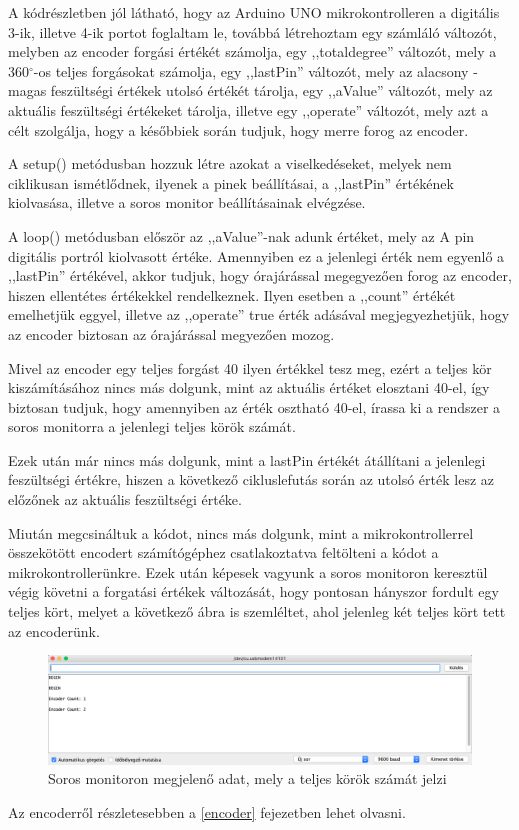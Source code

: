\documentclass[
]{thesis-ekf}
\theoremstyle{definition}
\theoremstyle{remark}
\begin{document}
			
			\par A kódrészletben jól látható, hogy az Arduino UNO mikrokontrolleren a digitális 3-ik, illetve 4-ik portot foglaltam le, továbbá létrehoztam egy számláló változót, melyben az encoder forgási értékét számolja, egy ,,totaldegree'' változót, mely a 360$^{\circ}$-os teljes forgásokat számolja, egy ,,lastPin'' változót, mely az alacsony - magas feszültségi értékek utolsó értékét tárolja, egy ,,aValue'' változót, mely az aktuális feszültségi értékeket tárolja, illetve egy ,,operate'' változót, mely azt a célt szolgálja, hogy a későbbiek során tudjuk, hogy merre forog az encoder.
			\par A setup() metódusban hozzuk létre azokat a viselkedéseket, melyek nem ciklikusan ismétlődnek, ilyenek a pinek beállításai, a ,,lastPin'' értékének kiolvasása, illetve a soros monitor beállításainak elvégzése.
			\par A loop() metódusban először az ,,aValue''-nak adunk értéket, mely az A pin digitális portról kiolvasott értéke. Amennyiben ez a jelenlegi érték nem egyenlő a ,,lastPin'' értékével, akkor tudjuk, hogy órajárással megegyezően forog az encoder, hiszen ellentétes értékekkel rendelkeznek. Ilyen esetben a ,,count'' értékét emelhetjük eggyel, illetve az ,,operate'' true érték adásával megjegyezhetjük, hogy az encoder biztosan az órajárással megyezően mozog.
			\par Mivel az encoder egy teljes forgást 40 ilyen értékkel tesz meg, ezért a teljes kör kiszámításához nincs más dolgunk, mint az aktuális értéket elosztani 40-el, így biztosan tudjuk, hogy amennyiben az érték osztható 40-el, írassa ki a rendszer a soros monitorra a jelenlegi teljes körök számát.
			\par Ezek után már nincs más dolgunk, mint a lastPin értékét átállítani a jelenlegi feszültségi értékre, hiszen a következő cikluslefutás során az utolsó érték lesz az előzőnek az aktuális feszültségi értéke.
			\par Miután megcsináltuk a kódot, nincs más dolgunk, mint a mikrokontrollerrel összekötött encodert számítógéphez csatlakoztatva feltölteni a kódot a mikrokontrollerünkre. Ezek után képesek vagyunk a soros monitoron keresztül végig követni a forgatási értékek változását, hogy pontosan hányszor fordult egy teljes kört, melyet a következő ábra is szemléltet, ahol jelenleg két teljes kört tett az encoderünk.
			\begin{figure}[H]
				\centering
				\includegraphics[scale=0.35]{./images/serialmonitor}
				\caption{Soros monitoron megjelenő adat, mely a teljes körök számát jelzi}
			\end{figure}
			\par Az encoderről részletesebben a \ref{encoder} fejezetben lehet olvasni.
			
\end{document}
